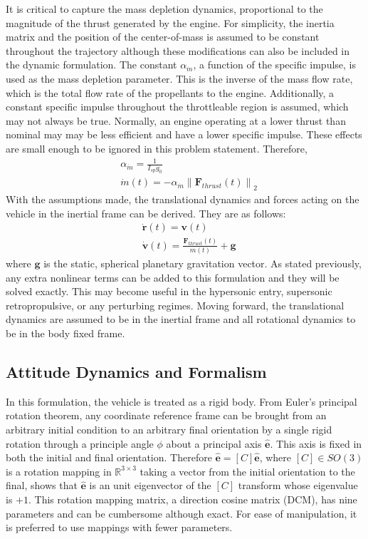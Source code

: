 \documentclass[conf]{new-aiaa}
\begin{document}
It is critical to capture the mass depletion dynamics, proportional to the magnitude of the thrust generated by the engine. For simplicity, the inertia matrix and the position of the center-of-mass is assumed to be constant throughout the trajectory although these modifications can also be included in the dynamic formulation. The constant $\alpha_{\dot{m}}$, a function of the specific impulse, is used as the mass depletion parameter. This is the inverse of the mass flow rate, which is the total flow rate of the propellants to the engine. Additionally, a constant specific impulse throughout the throttleable region is assumed, which may not always be true. Normally, an engine operating at a lower thrust than nominal may may be less efficient and have a lower specific impulse. These effects are small enough to be ignored in this problem statement. Therefore,
% 
\begin{align}
& \alpha_{\dot{m}} = \frac{1}{I_{sp} g_0} \\
& \dot{m}(t) = -\alpha_{\dot{m}} \left\lVert \mathbf{F}_{thrust}(t) \right\rVert _2
\end{align}
% 
With the assumptions made, the translational dynamics and forces acting on the vehicle in the inertial frame can be derived. They are as follows:
% 
\begin{align}
& \dot{\mathbf{r}}(t) = \mathbf{v}(t) \\
& \dot{\mathbf{v}}(t) = \frac{\mathbf{F}_{thrust}(t)}{m(t)} + \mathbf{g}
\end{align}
where $\mathbf{g}$ is the static, spherical planetary gravitation vector. As stated previously, any extra nonlinear terms can be added to this formulation and they will be solved exactly. This may become useful in the hypersonic entry, supersonic retropropulsive, or any perturbing regimes. Moving forward, the translational dynamics are assumed to be in the inertial frame and all rotational dynamics to be in the body fixed frame.

\subsection{Attitude Dynamics and Formalism}
In this formulation, the vehicle is treated as a rigid body. From Euler's principal rotation theorem,  any coordinate reference frame can be brought from an arbitrary initial condition to an arbitrary final orientation by a single rigid rotation through a principle angle $\phi$ about a principal axis $\hat{\bm{e}}$. This axis is fixed in both the initial and final orientation. Therefore $\hat{\bm{e}} = [C]\hat{\bm{e}}$, where $[C]\in SO(3)$ is a rotation mapping in $\mathbb{R}^{3\times3}$ taking a vector from the initial orientation to the final, shows that $\hat{\bm{e}}$ is an unit eigenvector of the $[C]$ transform whose eigenvalue is $+1$. This rotation mapping matrix, a direction cosine matrix (DCM), has nine parameters and can be cumbersome although exact. For ease of manipulation, it is preferred to use mappings with fewer parameters.
\end{document}
